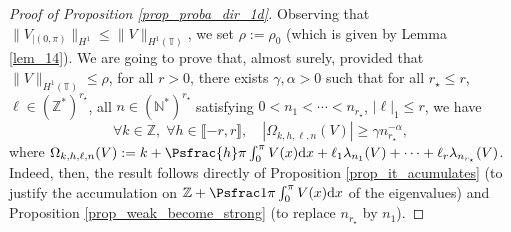 \begin{proof}[Proof of Proposition \ref{prop_proba_dir_1d}] Observing that $\| V_{|(0,\pi)}\|_{H^1} \leq \| V\|_{H^1(\mathbb{T})}$, we set $\rho:= \rho_0$ (which is given by Lemma \ref{lem_14}). We are going to prove that, almost surely, provided that $\| V\|_{H^1(\mathbb{T})} \leq \rho$, for all $r>0$, there exists $\gamma,\alpha>0$ such that for all $r_\star \leq r$, $\ell \in (\mathbb{Z}^*)^{r_\star}$, all $n \in (\mathbb{N}^*)^{r_\star}$ satisfying $0<n_1<\cdots<n_{r_\star}$, $|\ell|_1 \leq r$, we have
\begin{equation}
\label{eq_weak_NLS}
\forall k \in \mathbb{Z},\;\forall h\in \llbracket -r,r \rrbracket, \quad | \Omega_{k,h,\ell,n}(V) | \geq \gamma n_{r_\star}^{-\alpha},
\end{equation}
where
$\Omega_{k,h,\ell,n}(V):= k+\Psfrac{h}\pi \int_0^\pi V(x) \mathrm{d}x + \ell_1 \lambda_{n_1}(V)+\cdots+\ell_r \lambda_{n_{r_\star}}(V)$.
Indeed, then, the result follows directly of Proposition \ref{prop_it_acumulates} (to justify the accumulation on $\mathbb{Z}+ \Psfrac1\pi \int_0^\pi V(x) \mathrm{d}x$ of the eigenvalues) and Proposition \ref{prop_weak_become_strong} (to replace $n_{r_\star}$ by $n_{1}$).


\end{proof}
